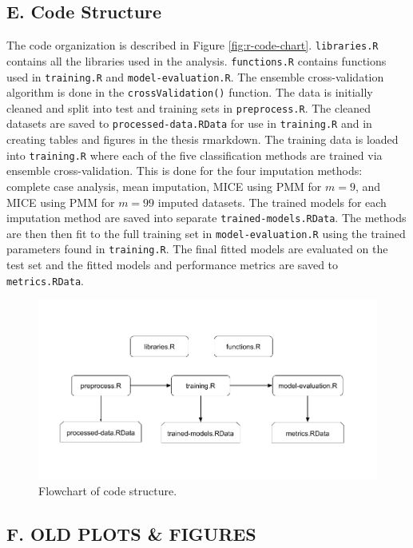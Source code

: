 \documentclass[12pt,]{article}
\begin{document}
\subsection{E. Code Structure}\label{e.-code-structure}

The code organization is described in Figure \ref{fig:r-code-chart}.
\texttt{libraries.R} contains all the libraries used in the analysis.
\texttt{functions.R} contains functions used in \texttt{training.R} and
\texttt{model-evaluation.R}. The ensemble cross-validation algorithm is
done in the \texttt{crossValidation()} function. The data is initially
cleaned and split into test and training sets in \texttt{preprocess.R}.
The cleaned datasets are saved to \texttt{processed-data.RData} for use
in \texttt{training.R} and in creating tables and figures in the thesis
rmarkdown. The training data is loaded into \texttt{training.R} where
each of the five classification methods are trained via ensemble
cross-validation. This is done for the four imputation methods: complete
case analysis, mean imputation, MICE using PMM for \(m=9\), and MICE
using PMM for \(m=99\) imputed datasets. The trained models for each
imputation method are saved into separate \texttt{trained-models.RData}.
The methods are then then fit to the full training set in
\texttt{model-evaluation.R} using the trained parameters found in
\texttt{training.R}. The final fitted models are evaluated on the test
set and the fitted models and performance metrics are saved to
\texttt{metrics.RData}.

\begin{figure}[H]

{\centering \includegraphics[width=1\linewidth]{images/r-code-chart} 

}

\caption{\label{fig:r-code-chart}Flowchart of code structure.}\label{fig:unnamed-chunk-19}
\end{figure}

\subsection{F. OLD PLOTS \& FIGURES}\label{f.-old-plots-figures}

\newpage


\end{document}

